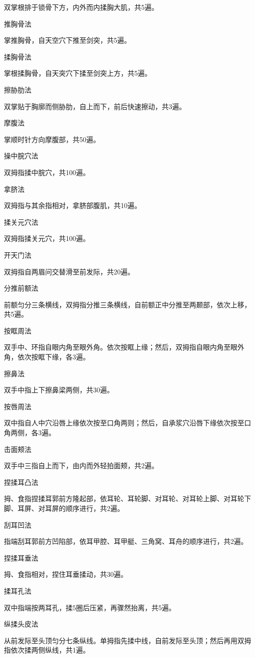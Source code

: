 \documentclass[12pt,UTF8,openany]{ctexbook}
\begin{document}
双掌根排于锁骨下方，内外而内揉胸大肌，共5遍。

推胸骨法

掌推胸骨，自天空穴下推至剑突，共5遍。

揉胸骨法

掌根揉胸骨，自天突穴下揉至剑突上方，共5遍。

擦胁肋法

双掌贴于胸廓而侧胁肋，自上而下，前后快速擦动，共3遍。

摩腹法

掌顺时针方向摩腹部，共50遍。

操中脘穴法

双拇指揉中脘穴，共100遍。

拿脐法

双拇指与其余指相对，拿脐部腹肌，共10遍。

揉关元穴法

双拇指揉关元穴，共100遍。

开天门法

双拇指自两眉问交替滑至前发际，共20遍。

分推前额法

前额匀分三条横线，双拇指分推三条横线，自前额正中分推至两颞部，依次上移，共5遍。

按眶周法

双手中、环指自眼内角至眼外角。依次按眶上缘；然后，双拇指自眼内角至眼外角，依次按眶下缘，各3遍。

擦鼻法

双手中指上下擦鼻梁两侧，共30遍。

按唇周法

双中指自人中穴沿唇上缘依次按至口角两则；然后，自承浆穴沿唇下缘依次按至口角两侧，各3遍。

击面颊法

双手中三指自上而下，由内而外轻拍面颊，共2遍。

捏揉耳凸法

拇、食指捏揉耳郭前方隆起部，依耳轮、耳轮脚、对耳轮、对耳轮上脚、对耳轮下脚、耳屏、对耳屏的顺序进行，共2遍。

刮耳凹法

指端刮耳郭前方凹陷部，依耳甲腔、耳甲艇、三角窝、耳舟的顺序进行，共2遍。

捏揉耳垂法

拇、食指相对，捏住耳垂揉动，共30遍。

揉耳孔法

双中指端按两耳孔，揉5圈后压紧，再骤然抬离，共5遍。

纵揉头皮法

从前发际至头顶匀分七条纵线。单拇指先揉中线，自前发际至头顶；然后再用双拇指依次揉两侧纵线，共1遍。
\end{document}
